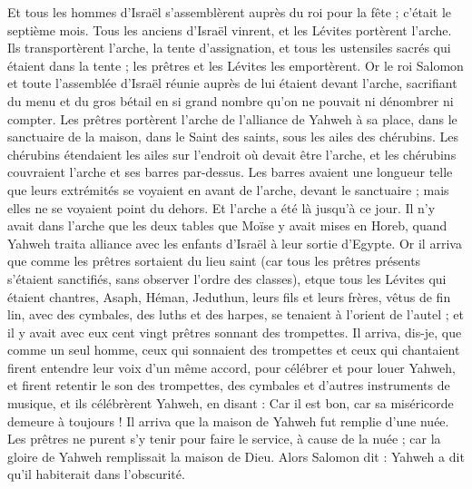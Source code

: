 \begin{multicols}{2}
Et tous les hommes d'Israël s'assemblèrent auprès du roi pour la fête ; c'était le septième mois.
Tous les anciens d'Israël vinrent, et les Lévites portèrent l'arche.
Ils transportèrent l'arche, la tente d'assignation, et tous les ustensiles sacrés qui étaient dans la tente ; les prêtres et les Lévites les emportèrent.
Or le roi Salomon et toute l'assemblée d'Israël réunie auprès de lui étaient devant l'arche, sacrifiant du menu et du gros bétail en si grand nombre qu'on ne pouvait ni dénombrer ni compter.
Les prêtres portèrent l'arche de l'alliance de Yahweh à sa place, dans le sanctuaire de la maison, dans le Saint des saints, sous les ailes des chérubins.
Les chérubins étendaient les ailes sur l'endroit où devait être l'arche, et les chérubins couvraient l'arche et ses barres par-dessus.
Les barres avaient une longueur telle que leurs extrémités se voyaient en avant de l'arche, devant le sanctuaire ; mais elles ne se voyaient point du dehors. Et l'arche a été là jusqu'à ce jour.
Il n'y avait dans l'arche que les deux tables que Moïse y avait mises en Horeb, quand Yahweh traita alliance avec les enfants d'Israël à leur sortie d'Egypte.
Or il arriva que comme les prêtres sortaient du lieu saint (car tous les prêtres présents s'étaient sanctifiés, sans observer l'ordre des classes),
etque tous les Lévites qui étaient chantres, Asaph, Héman, Jeduthun, leurs fils et leurs frères, vêtus de fin lin, avec des cymbales, des luths et des harpes, se tenaient à l'orient de l'autel ; et il y avait avec eux cent vingt prêtres sonnant des trompettes.
Il arriva, dis-je, que comme un seul homme, ceux qui sonnaient des trompettes et ceux qui chantaient firent entendre leur voix d'un même accord, pour célébrer et pour louer Yahweh, et firent retentir le son des trompettes, des cymbales et d'autres instruments de musique, et ils célébrèrent Yahweh, en disant : Car il est bon, car sa miséricorde demeure à toujours ! Il arriva que la maison de Yahweh fut remplie d'une nuée.
Les prêtres ne purent s'y tenir pour faire le service, à cause de la nuée ; car la gloire de Yahweh remplissait la maison de Dieu.
\VerseOne{}Alors Salomon dit : Yahweh a dit qu'il habiterait dans l'obscurité.

\end{multicols}
